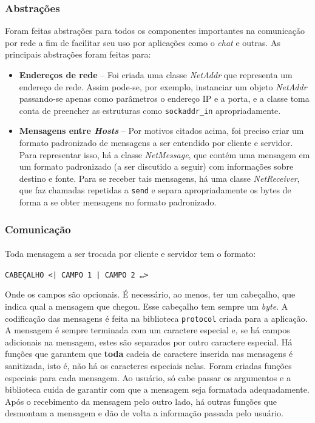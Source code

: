 \documentclass[11pt]{article}
\newcommand{\tit}[1]{\textit{#1}}
\newcommand{\tbf}[1]{\textbf{#1}}
\newcommand{\ttt}[1]{\texttt{#1}}
\begin{document}
\subsubsection{Abstrações}
Foram feitas abstrações para todos os componentes importantes na comunicação
por rede a fim de facilitar seu uso por aplicações como o \tit{chat} e outras.
As principais abstrações foram feitas para:
\begin{itemize}
	\item \tbf{Endereços de rede} -- Foi criada uma classe \tit{NetAddr} que 
		representa um endereço de rede. Assim pode-se, por exemplo, instanciar
		um objeto \tit{NetAddr} passando-se apenas como parâmetros o 
		endereço IP e a porta, e a classe toma conta de preencher as estruturas
		como \ttt{sockaddr\_in} apropriadamente.
	\item \tbf{Mensagens entre \tit{Hosts}} -- 
		Por motivos citados acima, foi preciso
		criar um formato padronizado de mensagens a ser entendido por 
		cliente e servidor. Para representar isso, há a classe \tit{NetMessage},
		que contém uma mensagem em um formato padronizado (a ser discutido a
		seguir) com informações sobre destino e fonte.
		Para se receber tais mensagens, há uma classe \tit{NetReceiver},
		que faz chamadas repetidas a \ttt{send} e separa apropriadamente os
		bytes de forma a se obter mensagens no formato padronizado.
\end{itemize}

\subsubsection{Comunicação}
\paragraph{}
Toda mensagem a ser trocada por cliente e servidor tem o formato:

\ttt{CABEÇALHO <| CAMPO 1 | CAMPO 2 \dots>}

Onde os campos são opcionais. É necessário, ao menos, ter um cabeçalho, que
indica qual a mensagem que chegou. 
Esse cabeçalho tem sempre um \tit{byte}.
A codificação das mensagens é feita na biblioteca \ttt{protocol} criada 
para a aplicação.
A mensagem é sempre terminada com um caractere especial e, se há campos 
adicionais na mensagem, estes são separados por outro caractere especial.
Há funções que garantem que \tbf{toda} cadeia de caractere inserida nas 
mensagens é sanitizada, isto é, não há os caracteres especiais nelas.
Foram criadas funções especiais para cada mensagem. 
Ao usuário, só cabe passar os argumentos e a biblioteca cuida de garantir
com que a mensagem seja formatada adequadamente.
Após o recebimento da mensagem pelo outro lado, há outras funções que 
desmontam a mensagem e dão de volta a informação passada pelo usuário.
\end{document}
